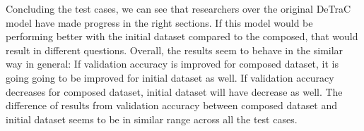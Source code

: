 \newline
\newline
Concluding the test cases, we can see that researchers over the original DeTraC model have made progress in the right sections. If this model would be performing better with the initial dataset compared to the composed, that would result in different questions. 
\newline
Overall, the results seem to behave in the similar way in general:
\newline
If validation accuracy is improved for composed dataset, it is going going to be improved for initial dataset as well. If validation accuracy decreases for composed dataset, initial dataset will have decrease as well. The difference of results from validation accuracy between composed dataset and initial dataset seems to be in similar range across all the test cases.
